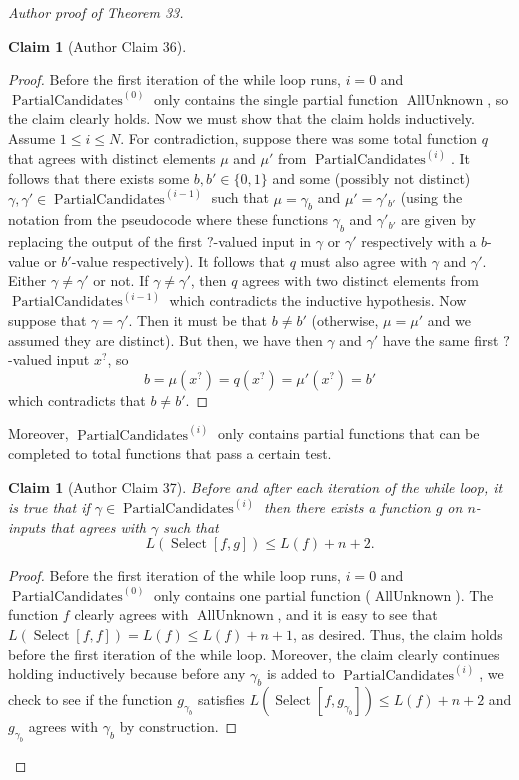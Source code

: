 \documentclass[10pt,a4paper]{article}
\newtheorem{ntclaim}[nttheorem]{Claim}
\newcommand{\Select}{\operatorname{Select}}
\newcommand{\PC}[1]{\operatorname{PartialCandidates}^{(#1)}}
\begin{document}
\begin{proof}[Author proof of Theorem 33]
\begin{ntclaim}[Author Claim 36]
\end{ntclaim}
\begin{proof}
Before the first iteration of the while loop runs, $i=0$ and $\PC{0}$ only contains the single partial function $\operatorname{AllUnknown}$, so the claim clearly holds.
Now we must show that the claim holds inductively. Assume $1\leq i\leq N$. For contradiction, suppose there was some total function $q$ that agrees with distinct elements $\mu$ and $\mu'$ from $\PC{i}$. It follows that there exists some $b,b'\in\{0,1\}$ and some (possibly not distinct) $\gamma,\gamma'\in\PC{i-1}$ such that $\mu=\gamma_b$ and $\mu'=\gamma'_{b'}$ (using the notation from the pseudocode where these functions $\gamma_b$ and $\gamma'_{b'}$ are given by replacing the output of the first $?$-valued input in $\gamma$ or $\gamma'$ respectively with a $b$-value or $b'$-value respectively). It follows that $q$ must also agree with $\gamma$ and $\gamma'$.
Either $\gamma\ne\gamma'$ or not. If $\gamma\ne\gamma'$, then $q$ agrees with two distinct elements from $\PC{i-1}$ which contradicts the inductive hypothesis.
Now suppose that $\gamma=\gamma'$. Then it must be that $b\ne b'$ (otherwise, $\mu=\mu'$ and we assumed they are distinct). But then, we have then $\gamma$ and $\gamma'$ have the same first $?$-valued input $x^?$, so
\[b=\mu(x^?)=q(x^?)=\mu'(x^?)=b'\]
which contradicts that $b\ne b'$.
\end{proof}
Moreover, $\PC{i}$ only contains partial functions that can be completed to total functions that pass a certain test.
\begin{ntclaim}[Author Claim 37]
Before and after each iteration of the while loop, it is true that if $\gamma\in\PC{i}$ then there exists a function $g$ on $n$-inputs that agrees with $\gamma$ such that
\[L(\Select[f,g])\leq L(f)+n+2.\]
\end{ntclaim}
\begin{proof}
Before the first iteration of the while loop runs, $i=0$ and $\PC{0}$ only contains one partial function ($\operatorname{AllUnknown}$). The function $f$ clearly agrees with $\operatorname{AllUnknown}$, and it is easy to see that $L(\Select[f,f])=L(f)\leq L(f)+n+1$, as desired. Thus, the claim holds before the first iteration of the while loop.
Moreover, the claim clearly continues holding inductively because before any $\gamma_b$ is added to $\PC{i}$, we check to see if the function $g_{\gamma_b}$ satisfies $L(\Select[f,g_{\gamma_b}])\leq L(f)+n+2$ and $g_{\gamma_b}$ agrees with $\gamma_b$ by construction.
\end{proof}

\end{proof}
\end{document}
